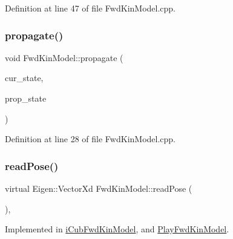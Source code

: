Definition at line 47 of file Fwd\+Kin\+Model.\+cpp.

\mbox{\label{classFwdKinModel_a9461ff14a1ae8d05169e8f1c7a6237c7}} 
\subsubsection{\texorpdfstring{propagate()}{propagate()}}
{\footnotesize\ttfamily void Fwd\+Kin\+Model\+::propagate (\begin{DoxyParamCaption}\item[{const Eigen\+::\+Ref$<$ const Eigen\+::\+Matrix\+Xf $>$ \&}]{cur\+\_\+state,  }\item[{Eigen\+::\+Ref$<$ Eigen\+::\+Matrix\+Xf $>$}]{prop\+\_\+state }\end{DoxyParamCaption})\hspace{0.3cm}{\ttfamily [override]}}



Definition at line 28 of file Fwd\+Kin\+Model.\+cpp.

\mbox{\label{classFwdKinModel_aaad9ff96f725fc529672e12aed86dc02}} 
\subsubsection{\texorpdfstring{read\+Pose()}{readPose()}}
{\footnotesize\ttfamily virtual Eigen\+::\+Vector\+Xd Fwd\+Kin\+Model\+::read\+Pose (\begin{DoxyParamCaption}{ }\end{DoxyParamCaption})\hspace{0.3cm}{\ttfamily [protected]}, {}}



Implemented in \hyperlink{classiCubFwdKinModel_ad549519048e9b54c18af51c6b173b726}{i\+Cub\+Fwd\+Kin\+Model}, and \hyperlink{classPlayFwdKinModel_a282700bc69b26e6ea28cc5048881a599}{Play\+Fwd\+Kin\+Model}.

\mbox{\label{classFwdKinModel_a12b54bd62ba5cf218973c600c66ba39e}} 
